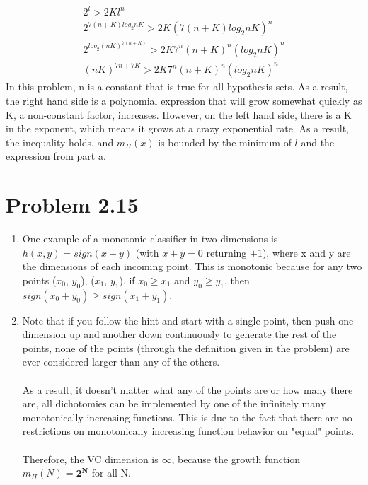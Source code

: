 \documentclass[12pt]{article}
\begin{document}
\begin{enumerate}[label=(\alph*)]
	\begin{gather*}
	2^l > 2Kl^n
	\\ 2^{7(n + K)log_2{nK}} > 2K(7(n+K)log_2{nK})^n
	\\ 2^{log_2{(nK)^{7(n + K)}}} > 2K7^n(n+K)^n(log_2{nK})^n
	\\ (nK)^{7n + 7K} > 2K7^n(n+K)^n(log_2{nK})^n
	\end{gather*}
	In this problem, n is a constant that is true for all hypothesis sets. As a result, the right hand side is a polynomial expression that will grow somewhat quickly as K, a non-constant factor, increases. However, on the left hand side, there is a K in the exponent, which means it grows at a crazy exponential rate. As a result, the inequality holds, and $m_H(x)$ is bounded by the minimum of $l$ and the expression from part a.
\end{enumerate}

\section*{Problem 2.15}
\begin{enumerate}[label=(\alph*)]
	\item One example of a monotonic classifier in two dimensions is $h(x, y) = sign(x + y)$ (with $x + y = 0$ returning $+1$), where x and y are the dimensions of each incoming point. This is monotonic because for any two points ($x_0$, $y_0$), ($x_1$, $y_1$), if $x_0 \ge x_1$ and $y_0 \ge y_1$, then $sign(x_0 + y_0) \ge sign(x_1 + y_1)$.
	\item Note that if you follow the hint and start with a single point, then push one dimension up and another down continuously to generate the rest of the points, none of the points (through the definition given in the problem) are ever considered larger than any of the others.
	\\ \\ As a result, it doesn't matter what any of the points are or how many there are, all dichotomies can be implemented by one of the infinitely many monotonically increasing functions. This is due to the fact that there are no restrictions on monotonically increasing function behavior on "equal" points.
	\\ \\ Therefore, the VC dimension is $\boldsymbol{\infty}$, because the growth function $m_H(N) = \boldsymbol{2^N}$ for all N.
\end{enumerate}
\end{document}

